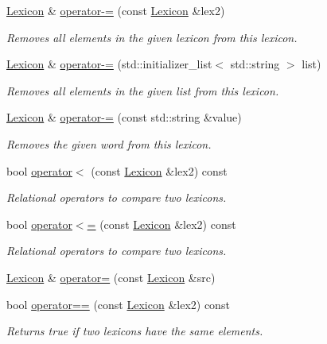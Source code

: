 \begin{DoxyCompactItemize}
\mbox{\hyperlink{classLexicon}{Lexicon}} \& \mbox{\hyperlink{classLexicon_ac51e54102d6257c1a0a48c99ad2520f6}{operator-\/=}} (const \mbox{\hyperlink{classLexicon}{Lexicon}} \&lex2)
\begin{DoxyCompactList}\small\item\em Removes all elements in the given lexicon from this lexicon. \end{DoxyCompactList}\item 
\mbox{\hyperlink{classLexicon}{Lexicon}} \& \mbox{\hyperlink{classLexicon_a1b3ac9124341c069a604d760190789b1}{operator-\/=}} (std\+::initializer\+\_\+list$<$ std\+::string $>$ list)
\begin{DoxyCompactList}\small\item\em Removes all elements in the given list from this lexicon. \end{DoxyCompactList}\item 
\mbox{\hyperlink{classLexicon}{Lexicon}} \& \mbox{\hyperlink{classLexicon_a4acb1cafdecdbf77b1d62f2372a6d244}{operator-\/=}} (const std\+::string \&value)
\begin{DoxyCompactList}\small\item\em Removes the given word from this lexicon. \end{DoxyCompactList}\item 
bool \mbox{\hyperlink{classLexicon_aad808851ca0fffc8b60fd0b69ad097bd}{operator$<$}} (const \mbox{\hyperlink{classLexicon}{Lexicon}} \&lex2) const
\begin{DoxyCompactList}\small\item\em Relational operators to compare two lexicons. \end{DoxyCompactList}\item 
bool \mbox{\hyperlink{classLexicon_a236ec3f5ec721fb4ca4551bf49123eac}{operator$<$=}} (const \mbox{\hyperlink{classLexicon}{Lexicon}} \&lex2) const
\begin{DoxyCompactList}\small\item\em Relational operators to compare two lexicons. \end{DoxyCompactList}\item 
\mbox{\hyperlink{classLexicon}{Lexicon}} \& \mbox{\hyperlink{classLexicon_ab9766b3af1f48ed51a1bcf037e08de43}{operator=}} (const \mbox{\hyperlink{classLexicon}{Lexicon}} \&src)
\item 
bool \mbox{\hyperlink{classLexicon_a4fcab616682564bf55eb0b096a35219d}{operator==}} (const \mbox{\hyperlink{classLexicon}{Lexicon}} \&lex2) const
\begin{DoxyCompactList}\small\item\em Returns true if two lexicons have the same elements. \end{DoxyCompactList}\item 

\end{DoxyCompactItemize}
